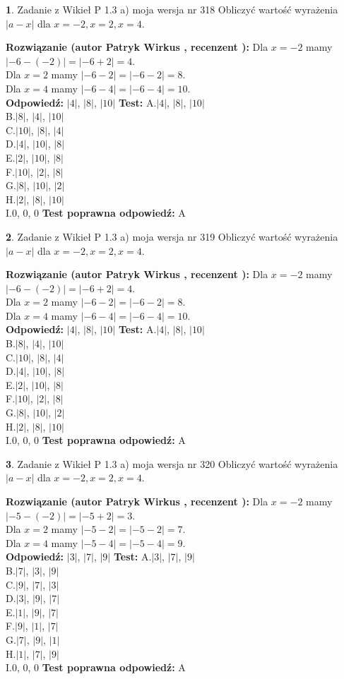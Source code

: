 \documentclass[12pt, a4paper]{article}
\theoremstyle{definition} %
\newtheorem{zad}{}
\newcommand{\zadStart}[1]{\begin{zad}#1\newline}
\newcommand{\zadStop}{\end{zad}}
\newcommand{\rozwStart}[2]{\noindent \textbf{Rozwiązanie (autor #1 , recenzent #2): }\newline}
\newcommand{\rozwStop}{\newline}
\newcommand{\odpStart}{\noindent \textbf{Odpowiedź:}\newline}
\newcommand{\odpStop}{\newline}
\newcommand{\testStart}{\noindent \textbf{Test:}\newline}
\newcommand{\testStop}{\newline}
\newcommand{\kluczStart}{\noindent \textbf{Test poprawna odpowiedź:}\newline}
\newcommand{\kluczStop}{\newline}
\begin{document}
\zadStart{Zadanie z Wikieł P 1.3 a) moja wersja nr 318}
Obliczyć wartość wyrażenia $|a - x|$ dla $x=-2,x=2,x=4$.
\zadStop
\rozwStart{Patryk Wirkus}{}
Dla $x = -2$ mamy $|-6 - (-2)| = |-6 + 2| = 4$.\\
Dla $x = 2$ mamy $|-6 - 2| = |-6 - 2| = 8$.\\
Dla $x = 4$ mamy $|-6 - 4| = |-6 - 4| = 10$.\\
\rozwStop
\odpStart
$|4|$, $|8|$, $|10|$
\odpStop
\testStart
A.$|4|$, $|8|$, $|10|$\\
B.$|8|$, $|4|$, $|10|$\\
C.$|10|$, $|8|$, $|4|$\\
D.$|4|$, $|10|$, $|8|$\\
E.$|2|$, $|10|$, $|8|$\\
F.$|10|$, $|2|$, $|8|$\\
G.$|8|$, $|10|$, $|2|$\\
H.$|2|$, $|8|$, $|10|$\\
I.$0$, $0$, $0$
\testStop
\kluczStart
A
\kluczStop



\zadStart{Zadanie z Wikieł P 1.3 a) moja wersja nr 319}
Obliczyć wartość wyrażenia $|a - x|$ dla $x=-2,x=2,x=4$.
\zadStop
\rozwStart{Patryk Wirkus}{}
Dla $x = -2$ mamy $|-6 - (-2)| = |-6 + 2| = 4$.\\
Dla $x = 2$ mamy $|-6 - 2| = |-6 - 2| = 8$.\\
Dla $x = 4$ mamy $|-6 - 4| = |-6 - 4| = 10$.\\
\rozwStop
\odpStart
$|4|$, $|8|$, $|10|$
\odpStop
\testStart
A.$|4|$, $|8|$, $|10|$\\
B.$|8|$, $|4|$, $|10|$\\
C.$|10|$, $|8|$, $|4|$\\
D.$|4|$, $|10|$, $|8|$\\
E.$|2|$, $|10|$, $|8|$\\
F.$|10|$, $|2|$, $|8|$\\
G.$|8|$, $|10|$, $|2|$\\
H.$|2|$, $|8|$, $|10|$\\
I.$0$, $0$, $0$
\testStop
\kluczStart
A
\kluczStop



\zadStart{Zadanie z Wikieł P 1.3 a) moja wersja nr 320}
Obliczyć wartość wyrażenia $|a - x|$ dla $x=-2,x=2,x=4$.
\zadStop
\rozwStart{Patryk Wirkus}{}
Dla $x = -2$ mamy $|-5 - (-2)| = |-5 + 2| = 3$.\\
Dla $x = 2$ mamy $|-5 - 2| = |-5 - 2| = 7$.\\
Dla $x = 4$ mamy $|-5 - 4| = |-5 - 4| = 9$.\\
\rozwStop
\odpStart
$|3|$, $|7|$, $|9|$
\odpStop
\testStart
A.$|3|$, $|7|$, $|9|$\\
B.$|7|$, $|3|$, $|9|$\\
C.$|9|$, $|7|$, $|3|$\\
D.$|3|$, $|9|$, $|7|$\\
E.$|1|$, $|9|$, $|7|$\\
F.$|9|$, $|1|$, $|7|$\\
G.$|7|$, $|9|$, $|1|$\\
H.$|1|$, $|7|$, $|9|$\\
I.$0$, $0$, $0$
\testStop
\kluczStart
A
\kluczStop
\end{document}
